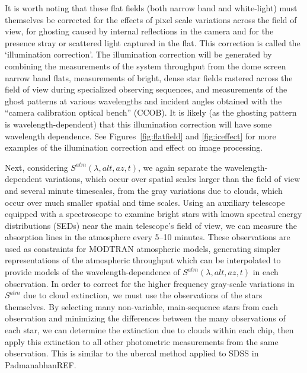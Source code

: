 \documentclass[12pt,preprint]{aastex}
\begin{document}
It is worth noting that these flat fields (both narrow band and
white-light) must themselves be corrected for the effects of pixel
scale variations across the field of view, for ghosting caused by
internal reflections in the camera and for the presence stray or
scattered light captured in the flat. This correction is called the
`illumination correction'. The illumination correction will be
generated by combining the measurements of the system throughput from
the dome screen narrow band flats, measurements of bright, dense star
fields rastered across the field of view during specialized observing
sequences, and measurements of the ghost patterns at various
wavelengths and incident angles obtained with the ``camera calibration
optical bench'' (CCOB).  It is likely (as the ghosting pattern is
wavelength-dependent) that this illumination correction will have some
wavelength dependence. See Figures~\ref{fig:flatfield} and
\ref{fig:iceffect} for more examples of the illumination correction
and effect on image processing.

Next, considering $S^{atm}(\lambda,alt,az,t)$, we again separate the
wavelength-dependent variations, which occur over spatial scales
larger than the field of view and several minute timescales, from the
gray variations due to clouds, which occur over much smaller spatial
and time scales. Using an auxiliary telescope equipped with a
spectroscope to examine bright stars with known spectral energy
distributions (SEDs) near the main telescope's field of view, we can
measure the absorption lines in the atmosphere every 5--10
minutes. These observations are used as constraints for MODTRAN
atmospheric models, generating simpler representations of the
atmospheric throughput which can be interpolated to provide models of
the wavelength-dependence of $S^{atm}(\lambda,alt,az,t)$ in each
observation. In order to correct for the higher frequency gray-scale
variations in $S^{atm}$ due to cloud extinction, we must use the
observations of the stars themselves. By selecting many non-variable,
main-sequence stars from each observation and minimizing the
differences between the many observations of each star, we can
determine the extinction due to clouds within each chip, then apply
this extinction to all other photometric measurements from the same
observation. This is similar to the ubercal method applied to SDSS in
PadmanabhanREF.
\end{document}
